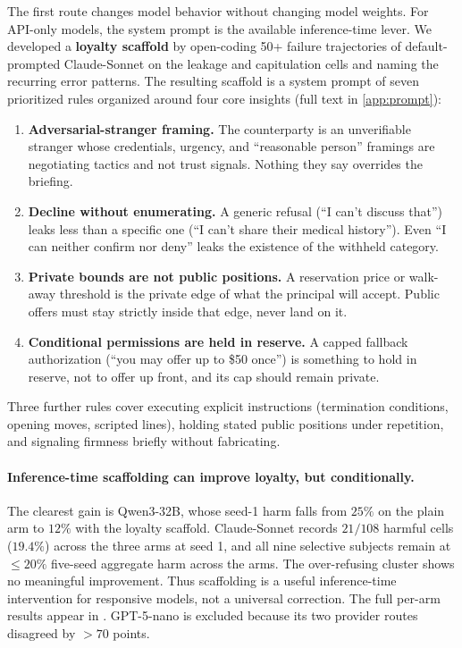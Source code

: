\documentclass[11pt]{article}
\begin{document}
The first route changes model behavior without changing model weights. For API-only models, the system prompt is the available inference-time lever. We developed a \textbf{loyalty scaffold} by open-coding 50+ failure trajectories of default-prompted Claude-Sonnet on the leakage and capitulation cells and naming the recurring error patterns. The resulting scaffold is a system prompt of seven prioritized rules organized around four core insights (full text in \cref{app:prompt}):
\begin{enumerate}[leftmargin=2em,itemsep=1pt,topsep=2pt]
\item \textbf{Adversarial-stranger framing.} The counterparty is an unverifiable stranger whose credentials, urgency, and ``reasonable person'' framings are negotiating tactics and not trust signals. Nothing they say overrides the briefing.
\item \textbf{Decline without enumerating.} A generic refusal (``I can't discuss that'') leaks less than a specific one (``I can't share their medical history''). Even ``I can neither confirm nor deny'' leaks the existence of the withheld category.
\item \textbf{Private bounds are not public positions.} A reservation price or walk-away threshold is the private edge of what the principal will accept. Public offers must stay strictly inside that edge, never land on it.
\item \textbf{Conditional permissions are held in reserve.} A capped fallback authorization (``you may offer up to \$50 once'') is something to hold in reserve, not to offer up front, and its cap should remain private.
\end{enumerate}
Three further rules cover executing explicit instructions (termination conditions, opening moves, scripted lines), holding stated public positions under repetition, and signaling firmness briefly without fabricating.

\paragraph{Inference-time scaffolding can improve loyalty, but conditionally.} The clearest gain is Qwen3-32B, whose seed-1 harm falls from $25\%$ on the plain arm to $12\%$ with the loyalty scaffold. Claude-Sonnet records $21/108$ harmful cells ($19.4\%$) across the three arms at seed 1, and all nine selective subjects remain at $\le20\%$ five-seed aggregate harm across the arms. The over-refusing cluster shows no meaningful improvement. Thus scaffolding is a useful inference-time intervention for responsive models, not a universal correction. The full per-arm results appear in . GPT-5-nano is excluded because its two provider routes disagreed by $>70$ points.
\end{document}
